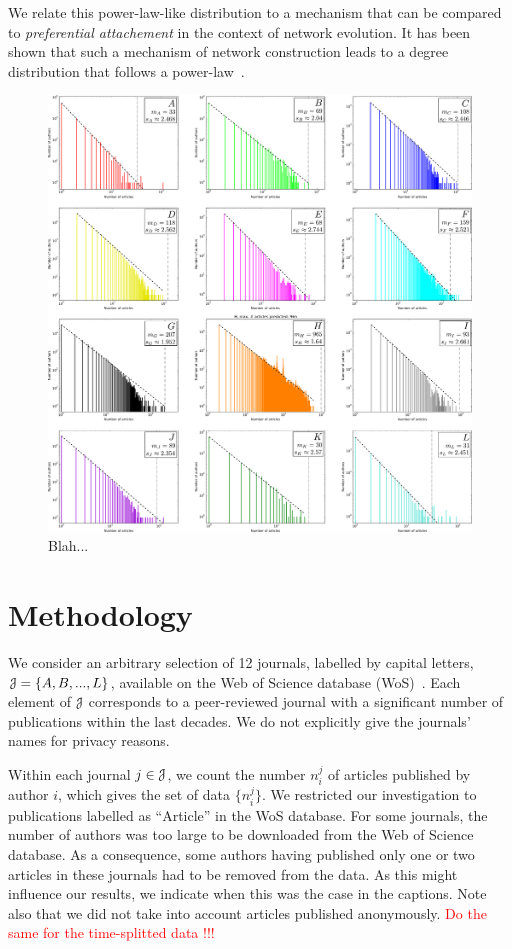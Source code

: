 \documentclass[aps,prl,floatfix,twocolumn]{revtex4-1}
\begin{document}
We relate this power-law-like distribution to a mechanism that can be compared to \emph{preferential attachement} in the context of network evolution. 
It has been shown that such a mechanism of network construction leads to a degree distribution that follows a power-law~\cite{Kra00}.

\begin{figure}
 \centering
 \includegraphics[width=\textwidth]{figures/ABCDEFGHIJKL.pdf}
 \caption{Blah...}
 \label{fig:1}
\end{figure}

\section{Methodology}
We consider an arbitrary selection of 12 journals, labelled by capital letters, ${\cal J}=\{A,B,...,L\}$, available on the Web of Science database (WoS)~\cite{WoS}. 
Each element of ${\cal J}$ corresponds to a peer-reviewed journal with a significant number of publications within the last decades. 
We do not explicitly give the journals' names for privacy reasons.

Within each journal $j\in {\cal J}$, we count the number $n^j_i$ of articles published by author $i$, which gives the set of data $\{n^j_i\}$. 
We restricted our investigation to publications labelled as ``Article'' in the WoS database.
For some journals, the number of authors was too large to be downloaded from the Web of Science database. 
As a consequence, some authors having published only one or two articles in these journals had to be removed from the data. 
As this might influence our results, we indicate when this was the case in the captions. 
Note also that we did not take into account articles published anonymously. 
\textcolor{red}{Do the same for the time-splitted data !!!}
\end{document}
